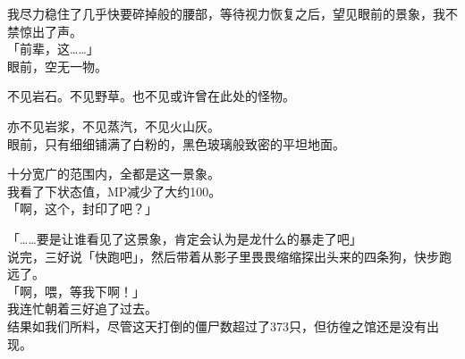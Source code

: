 我尽力稳住了几乎快要碎掉般的腰部，等待视力恢复之后，望见眼前的景象，我不禁惊出了声。\\

「前辈，这……」\\

眼前，空无一物。

不见岩石。不见野草。也不见或许曾在此处的怪物。

亦不见岩浆，不见蒸汽，不见火山灰。\\

眼前，只有细细铺满了白粉的，黑色玻璃般致密的平坦地面。

十分宽广的范围内，全都是这一景象。\\

我看了下状态值，MP减少了大约100。\\

「啊，这个，封印了吧？」

「……要是让谁看见了这景象，肯定会认为是龙什么的暴走了吧」\\

说完，三好说「快跑吧」，然后带着从影子里畏畏缩缩探出头来的四条狗，快步跑远了。\\

「啊，喂，等我下啊！」\\

我连忙朝着三好追了过去。\\

结果如我们所料，尽管这天打倒的僵尸数超过了373只，但彷徨之馆还是没有出现。\\
